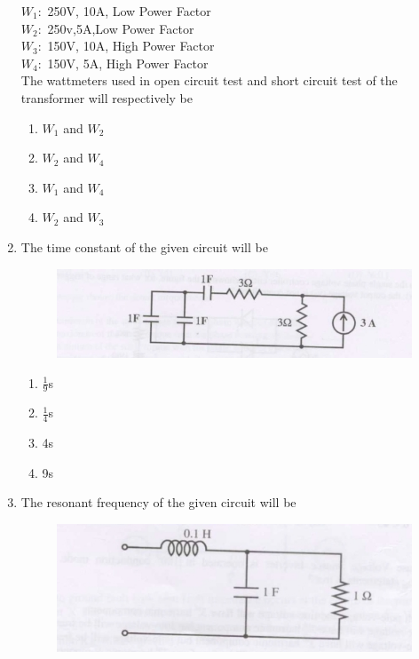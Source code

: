 \documentclass[journal,12pt,onecolumn]{IEEEtran}
\theoremstyle{remark}
\begin{document}
\begin{enumerate}
    $W_1:$ 250V, 10A, Low Power Factor\\
    $W_2:$ 250v,5A,Low Power Factor\\
    $W_3:$ 150V, 10A, High Power Factor\\
    $W_4:$ 150V, 5A, High Power Factor\\
    The wattmeters used in open circuit test and short circuit test of the transformer will respectively be 
    \begin{enumerate}
        \item $W_1$ and $W_2$
        \item $W_2$ and $W_4$
        \item $W_1$ and $W_4$
        \item $W_2$ and $W_3$
    \end{enumerate}
   \item The time constant of the given circuit will be\\
   \begin{figure}[h!]
   \centering
   \includegraphics[width=0.7\linewidth]{figs/fig1.jpg}
   \label{fig:11011}
   \end{figure}
   \begin{enumerate}
       \item $\frac{1}{9}$s
       \item $\frac{1}{4}$s
       \item 4s
       \item 9s
       \end{enumerate}
       \item  The resonant frequency of the given circuit will be\\
       \begin{figure}[h!]
       \centering
       \includegraphics[width=0.7\linewidth]{figs/fig2.jpg}
       \label{fig:11011}
       \end{figure}
       \begin{enumerate}

\end{enumerate}
\end{enumerate}
\end{document}
